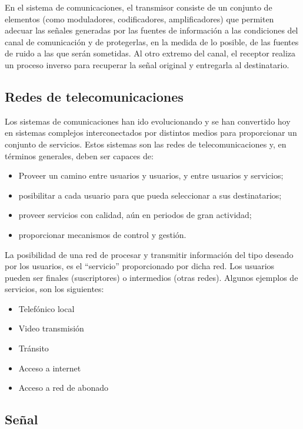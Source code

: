 \documentclass[
]{book}
\providecommand{\tightlist}{%
  \setlength{\itemsep}{0pt}\setlength{\parskip}{0pt}}
\begin{document}
En el sistema de comunicaciones, el transmisor consiste de un conjunto de elementos (como moduladores, codificadores, amplificadores) que permiten adecuar las señales generadas por las fuentes de información a las condiciones del canal de comunicación y de protegerlas, en la medida de lo posible, de las fuentes de ruido a las que serán sometidas. Al otro extremo del canal, el receptor realiza un proceso inverso para recuperar la señal original y entregarla al destinatario.

\hypertarget{redes-de-telecomunicaciones}{%
\subsection{Redes de telecomunicaciones}\label{redes-de-telecomunicaciones}}

Los sistemas de comunicaciones han ido evolucionando y se han convertido hoy en sistemas complejos interconectados por distintos medios para proporcionar un conjunto de servicios. Estos sistemas son las redes de telecomunicaciones y, en términos generales, deben ser capaces de:

\begin{itemize}
\tightlist
\item
  Proveer un camino entre usuarios y usuarios, y entre usuarios y servicios;
\item
  posibilitar a cada usuario para que pueda seleccionar a sus destinatarios;
\item
  proveer servicios con calidad, aún en periodos de gran actividad;
\item
  proporcionar mecanismos de control y gestión.
\end{itemize}

La posibilidad de una red de procesar y transmitir información del tipo deseado por los usuarios, es el ``servicio'' proporcionado por dicha red. Los usuarios pueden ser finales (suscriptores) o intermedios (otras redes). Algunos ejemplos de servicios, son los siguientes:

\begin{itemize}
\tightlist
\item
  Telefónico local
\item
  Video transmisión
\item
  Tránsito
\item
  Acceso a internet
\item
  Acceso a red de abonado
\end{itemize}

\hypertarget{seuxf1al}{%
\subsection{Señal}\label{seuxf1al}}
\end{document}
